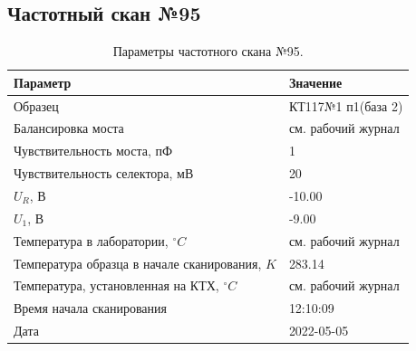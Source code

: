 \subsection{Частотный скан №95}
\begin{table}[!ht]
    \centering
    \caption{Параметры частотного скана №95.}
    \begin{tabular}{|l|l|}
        \hline
        Параметр                                       & Значение                  \\ \hline
        Образец                                        & КТ117№1 п1(база 2)        \\ \hline
        Балансировка моста                             & см. рабочий журнал        \\ \hline
        Чувствительность моста, пФ                     & 1                         \\ \hline
        Чувствительность селектора, мВ                 & 20                        \\ \hline
        $U_R$, В                                       & -10.00                    \\ \hline
        $U_1$, В                                       & -9.00                     \\ \hline
        Температура в лаборатории, $^\circ C$          & см. рабочий журнал        \\ \hline
        Температура образца в начале сканирования, $K$ & 283.14                    \\ \hline
        Температура, установленная на КТХ, $^\circ C$  & см. рабочий журнал        \\ \hline
        Время начала сканирования                      & 12:10:09                  \\ \hline
        Дата                                           & 2022-05-05                \\ \hline
    \end{tabular}
    \label{table:frequency_scan_95}
\end{table}


